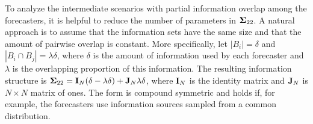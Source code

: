 \documentclass[12pt]{article}
\theoremstyle{definition}
\theoremstyle{definition}
\def\probit{p_{\rm probit}}
\begin{document}
To analyze the intermediate scenarios with partial information overlap among the forecasters, it is helpful to reduce the number of parameters in ${\bf\Sigma}_{22}$. A natural approach is to assume that the
information sets have the same size and that the amount of pairwise overlap
is constant. More specifically, let $|B_{i}| =
\delta$ and $|B_{i} \cap B_{j}| = \lambda \delta$, where $\delta$ is the amount of information used by each forecaster and
$\lambda$ is the overlapping proportion of this information. The resulting information structure is ${\bf\Sigma}_{22} = {\bf I}_N(\delta - \lambda \delta) + {\bf J}_N \lambda \delta$, where ${\bf I}_N$ is the identity matrix and ${\bf J}_N$ is $N \times N$ matrix of ones.
The form is compound symmetric and holds if, for example, the
forecasters use information sources sampled from a common distribution. 
\end{document}
